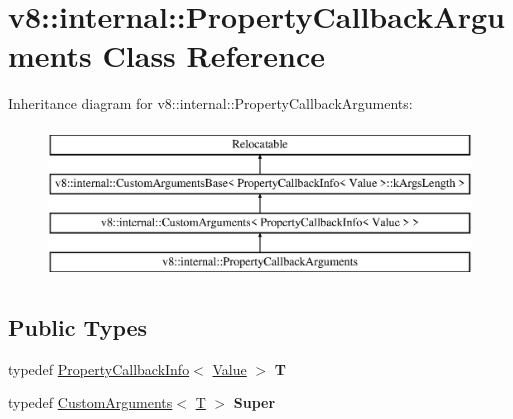 \hypertarget{classv8_1_1internal_1_1_property_callback_arguments}{}\section{v8\+:\+:internal\+:\+:Property\+Callback\+Arguments Class Reference}
\label{classv8_1_1internal_1_1_property_callback_arguments}
Inheritance diagram for v8\+:\+:internal\+:\+:Property\+Callback\+Arguments\+:\begin{figure}[H]
\begin{center}
\leavevmode
\includegraphics[height=4.000000cm]{classv8_1_1internal_1_1_property_callback_arguments}
\end{center}
\end{figure}
\subsection*{Public Types}
\begin{DoxyCompactItemize}
\item 
typedef \hyperlink{classv8_1_1_property_callback_info}{Property\+Callback\+Info}$<$ \hyperlink{classv8_1_1_value}{Value} $>$ {\bfseries T}\hypertarget{classv8_1_1internal_1_1_property_callback_arguments_a4a81899f78a5d50709980730f670aa48}{}\label{classv8_1_1internal_1_1_property_callback_arguments_a4a81899f78a5d50709980730f670aa48}

\item 
typedef \hyperlink{classv8_1_1internal_1_1_custom_arguments}{Custom\+Arguments}$<$ \hyperlink{classv8_1_1_property_callback_info}{T} $>$ {\bfseries Super}\hypertarget{classv8_1_1internal_1_1_property_callback_arguments_a80f9d07cc7e4412c0f87aa36c0c6bd35}{}\label{classv8_1_1internal_1_1_property_callback_arguments_a80f9d07cc7e4412c0f87aa36c0c6bd35}

\end{DoxyCompactItemize}
